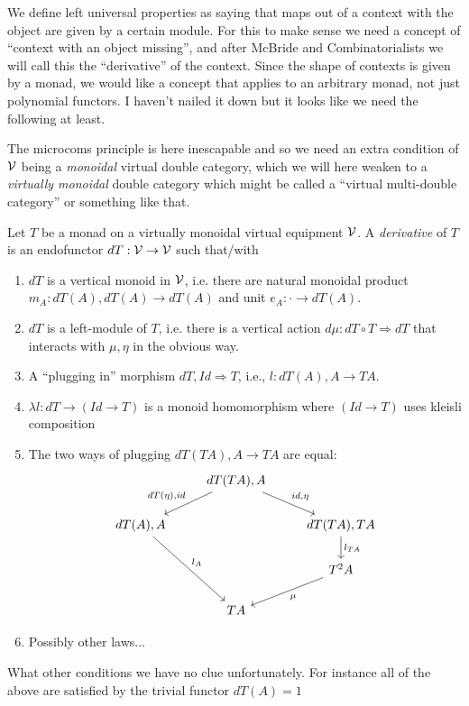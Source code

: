 \documentclass{article}
\begin{document}
We define left universal properties as saying that maps out of a
context with the object are given by a certain module. For this to
make sense we need a concept of ``context with an object missing'',
and after McBride and Combinatorialists we will call this the
``derivative'' of the context. Since the shape of contexts is given by
a monad, we would like a concept that applies to an arbitrary monad,
not just polynomial functors. I haven't nailed it down but it looks
like we need the following at least.

The microcoms principle is here inescapable and so we need an extra
condition of $\mathcal V$ being a \emph{monoidal} virtual double
category, which we will here weaken to a \emph{virtually monoidal}
double category which might be called a ``virtual multi-double
category'' or something like that.

\begin{definition}
  Let $T$ be a monad on a virtually monoidal virtual equipment $\mathcal
  V$. A \emph{derivative} of $T$ is an endofunctor $dT : \mathcal V \to
  \mathcal V$ such that/with
  \begin{enumerate}
  \item $dT$ is a vertical monoid in $\mathcal V$, i.e. there are natural
    monoidal product $m_A : dT(A),dT(A) \to dT(A)$ and unit $e_A :
    \cdot \to dT(A)$.
  \item $dT$ is a left-module of $T$, i.e. there is a vertical action
    $d\mu : dT \circ T \Rightarrow dT$ that interacts with $\mu,\eta$
    in the obvious way.
  \item A ``plugging in'' morphism $dT,Id \Rightarrow T$, i.e., $l :
    dT(A),A \to TA$.
  \item $\lambda l : dT \to (Id \to T)$ is a monoid homomorphism
    where $(Id \to T)$ uses kleisli composition
  \item The two ways of plugging $dT(T A), A \to T A$ are equal:
    \[\begin{tikzcd}
 & dT(TA),A \arrow[ld, "{dT(\eta),id}"'] \arrow[rd, "{id,\eta}"] &  \\
dT(A),A \arrow[rdd, "l_A"] &  & dT(TA),TA \arrow[d, "l_{TA}"] \\
 &  & T^2A \arrow[ld, "\mu"] \\
 & TA & 
    \end{tikzcd}\]
  \item Possibly other laws...
  \end{enumerate}
\end{definition}
What other conditions we have no clue unfortunately. For instance all
of the above are satisfied by the trivial functor $dT(A) = 1$
\end{document}
